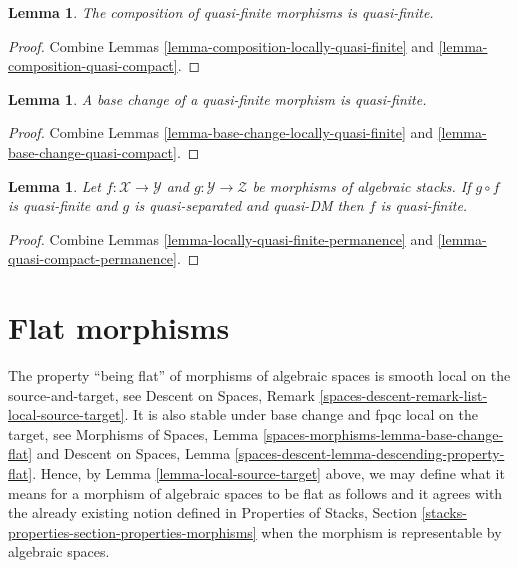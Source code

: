 \documentclass{stacks-project}
\theoremstyle{plain}
\newtheorem{lemma}[subsection]{Lemma}
\theoremstyle{definition}
\theoremstyle{remark}
\numberwithin{equation}{subsection}
\begin{document}
\begin{lemma}
\label{lemma-composition-quasi-finite}
The composition of quasi-finite morphisms is quasi-finite.
\end{lemma}

\begin{proof}
Combine
Lemmas \ref{lemma-composition-locally-quasi-finite} and
\ref{lemma-composition-quasi-compact}.
\end{proof}

\begin{lemma}
\label{lemma-base-change-quasi-finite}
A base change of a quasi-finite morphism is quasi-finite.
\end{lemma}

\begin{proof}
Combine
Lemmas \ref{lemma-base-change-locally-quasi-finite} and
\ref{lemma-base-change-quasi-compact}.
\end{proof}

\begin{lemma}
\label{lemma-quasi-finite-permanence}
Let $f : \mathcal{X} \to \mathcal{Y}$ and
$g : \mathcal{Y} \to \mathcal{Z}$ be morphisms of algebraic stacks.
If $g \circ f$ is quasi-finite and $g$ is quasi-separated and quasi-DM
then $f$ is quasi-finite.
\end{lemma}

\begin{proof}
Combine
Lemmas \ref{lemma-locally-quasi-finite-permanence} and
\ref{lemma-quasi-compact-permanence}.
\end{proof}












\section{Flat morphisms}
\label{section-flat}

\noindent
The property ``being flat'' of morphisms of algebraic
spaces is smooth local on the source-and-target, see
Descent on Spaces, Remark \ref{spaces-descent-remark-list-local-source-target}.
It is also stable under base change and fpqc local on the target, see
Morphisms of Spaces,
Lemma \ref{spaces-morphisms-lemma-base-change-flat}
and
Descent on Spaces, Lemma
\ref{spaces-descent-lemma-descending-property-flat}.
Hence, by
Lemma \ref{lemma-local-source-target}
above, we may define what it means for a morphism of algebraic spaces
to be flat as follows and it agrees with the already
existing notion defined in
Properties of Stacks,
Section \ref{stacks-properties-section-properties-morphisms}
when the morphism is representable by algebraic spaces.
\end{document}
